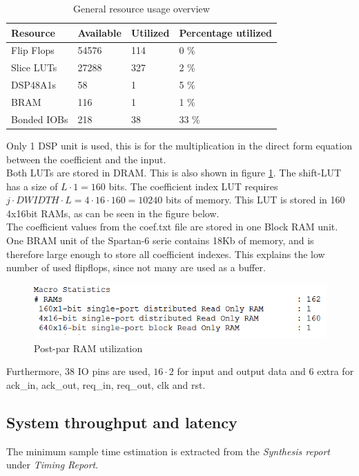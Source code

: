 \documentclass[a4paper,twoside,11pt, fleqn]{article}
\begin{document}
\begin{table}[h]
\begin{tabular}{|l|l|l|l|}
\hline
\textbf{Resource} & \textbf{Available} & \textbf{Utilized} & \textbf{Percentage utilized}\\
\hline
Flip Flops	& 54576 & 114 	& 0 \%\\
Slice LUTs 	& 27288 & 327 	& 2 \%\\
DSP48A1s	& 58 	& 1 	& 5 \%\\
BRAM		& 116 	& 1 	& 1 \%\\
Bonded IOBs	& 218 	& 38 	& 33 \%\\
\hline
\end{tabular}
\caption{General resource usage overview}
\label{tab:4usage}
\end{table}

Only 1 DSP unit is used, this is for the multiplication in the direct form equation between the coefficient and the input.\\

Both LUTs are stored in DRAM. This is also shown in figure \ref{fig:RAM}. The shift-LUT has a size of $L\cdot 1 = 160$ bits. The coefficient index LUT requires $j\cdot DWIDTH\cdot L = 4\cdot 16 \cdot 160 = 10240$ bits of memory. This LUT is stored in 160 4x16bit RAMs, as can be seen in the figure below.\\ 

The coefficient values from the coef.txt file are stored in one Block RAM unit. One BRAM  unit of the Spartan-6 serie contains 18Kb of memory, and is therefore large enough to store all coefficient indexes. This explains the low number of used flipflops, since not many are used as a buffer.

\begin{figure}[h]
	\includegraphics[scale = 0.9]{Images/simulation_missingregisters}
    \caption{Post-par RAM utilization}
    \label{fig:RAM}
\end{figure}

Furthermore, 38 IO pins are used, $16\cdot 2$ for input and output data and 6 extra for ack\_in, ack\_out, req\_in, req\_out, clk and rst.

\newpage
\subsection{System throughput and latency}
\label{sec:thr4}
The minimum sample time estimation is extracted from the \textit{Synthesis report} under \textit{Timing Report}.\\
\end{document}
